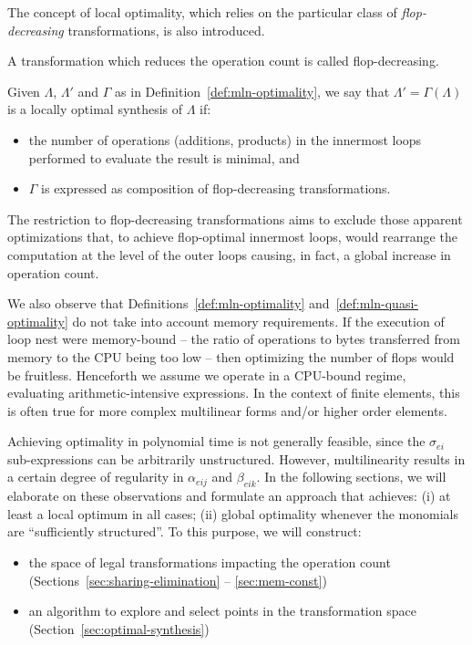 The concept of local optimality, which relies on the particular class of \textit{flop-decreasing} transformations, is also introduced.

\begin{Def}
A transformation which reduces the operation count is called flop-decreasing.
\end{Def}

\begin{Def}
\label{def:mln-quasi-optimality}
Given $\Lambda$, $\Lambda'$ and $\Gamma$ as in Definition~\ref{def:mln-optimality}, we say that $\Lambda' = \Gamma (\Lambda)$ is a locally optimal synthesis of $\Lambda$ if:
\begin{itemize}
\item the number of operations (additions, products) in the innermost loops performed to evaluate the result is minimal, and
\item $\Gamma$ is expressed as composition of flop-decreasing transformations.
\end{itemize}
\end{Def}

The restriction to flop-decreasing transformations aims to exclude those apparent optimizations that, to achieve flop-optimal innermost loops, would rearrange the computation at the level of the outer loops causing, in fact, a global increase in operation count. 

We also observe that Definitions~\ref{def:mln-optimality} and~\ref{def:mln-quasi-optimality} do not take into account memory requirements. If the execution of loop nest were memory-bound -- the ratio of operations to bytes transferred from memory to the CPU being too low -- then optimizing the number of flops would be fruitless. Henceforth we assume we operate in a CPU-bound regime, evaluating arithmetic-intensive expressions. In the context of finite elements, this is often true for more complex multilinear forms and/or higher order elements. 

Achieving optimality in polynomial time is not generally feasible, since the $\sigma_{ei}$ sub-expressions can be arbitrarily unstructured. However, multilinearity results in a certain degree of regularity in $\alpha_{eij}$ and $\beta_{eik}$. In the following sections, we will elaborate on these observations and formulate an approach that achieves: (i) at least a local optimum in all cases; (ii) global optimality whenever the monomials are ``sufficiently structured''. To this purpose, we will construct:
\begin{itemize}
\item the space of legal transformations impacting the operation count (Sections~\ref{sec:sharing-elimination} -- \ref{sec:mem-const})
\item an algorithm to explore and select points in the transformation space (Section~\ref{sec:optimal-synthesis})
\end{itemize}


